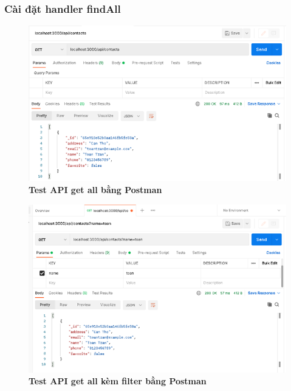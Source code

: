 \subsubsection*{Cài đặt handler findAll}
\begin{figure}[H]
  \centering
  \includegraphics[width=15cm]{images/chapterSecond/5.png}
  \caption{\bfseries Test API get all bằng Postman}
\end{figure}
\begin{figure}[H]
  \centering
  \includegraphics[width=15cm]{images/chapterSecond/6.png}
  \caption{\bfseries Test API get all kèm filter bằng Postman}
\end{figure}
